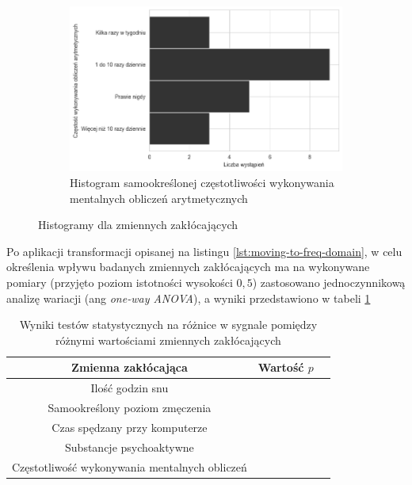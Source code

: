 \documentclass{./assets/wfis}
\begin{document}
\begin{figure}[h!]
\begin{subfigure}[b]{\textwidth}
    \includegraphics[width=0.75\columnwidth]{thesis/assets/mental_math.png}
    \caption{Histogram samookreślonej częstotliwości wykonywania mentalnych obliczeń arytmetycznych}
    \label{fig:arithmetic}
\end{subfigure}
\caption{Histogramy dla zmiennych zakłócających}
\end{figure}

Po aplikacji transformacji opisanej na listingu \ref{lst:moving-to-freq-domain}, w celu określenia wpływu  badanych zmiennych zakłócających ma na wykonywane pomiary (przyjęto poziom istotności wysokości $0,5$) zastosowano jednoczynnikową analizę wariacji (ang \textit{one-way ANOVA}), a wyniki przedstawiono w tabeli \ref{tab:confunding-variables-statistical-tests} 

\begin{table}[h!]
    \centering
    \begin{tabular}{|c|c|c|}
        \hline
          Zmienna zakłócająca & Wartość $p$\\
        \hline
         Ilość godzin snu & \\
         Samookreślony poziom zmęczenia &  \\
         Czas spędzany przy komputerze & \\
         Substancje psychoaktywne  & \\
         Częstotliwość wykonywania mentalnych obliczeń & \\
        \hline
    \end{tabular}
    \caption{Wyniki testów statystycznych na różnice w sygnale pomiędzy różnymi wartościami zmiennych zakłócających}
    \label{tab:confunding-variables-statistical-tests}
\end{table}

\end{document}
